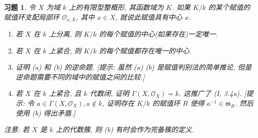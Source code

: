 \documentclass{article}
\theoremstyle{exercise}
\newtheorem{exercise}{习题}[section]
\theoremstyle{plain}
\theoremstyle{remark}
\def\gm{\mathfrak{m}}
\def\cO{\mathscr{O}}
\begin{document}
\begin{exercise}
  令 $X$ 为域 $k$ 上的有限型整概形, 其函数域为 $K$.
  如果 $K / k$ 的某个赋值的赋值环支配局部环 $\cO_{x, X}$, 其中 $x \in X$,
  就说此赋值具有\emph{中心} $x$.
  \begin{enumerate}[label=(\alph*)]
    \item 若 $X$ 在 $k$ 上分离, 则 $K / k$ 的每个赋值的中心(如果存在)一定唯一.
    \item 若 $X$ 在 $k$ 上紧合, 则 $K / k$ 的每个赋值都存在唯一的中心.
    \item 证明 (a) 和 (b) 的逆命题.
          [\emph{提示: 虽然 (a) (b) 是赋值判别法的简单推论,
          但是逆命题需要不同的域中的赋值之间的比较.}]
    \item 若 $X$ 在 $k$ 上紧合, 且 $k$ 代数闭,
          证明 $\Gamma(X, \cO_X) = k$.
          这推广了 (I, 3.4a).
          [\emph{提示: 令 $a \in \Gamma(X, \cO_X), a \notin k$,
          证明存在 $K / k$ 的赋值环 $R$ 使得 $a^{-1} \in \gm_R$.
          然后使用 (b) 得出矛盾.}]
  \end{enumerate}
  \textit{注意:} 若 $X$ 是 $k$ 上的代数簇, 则 (b) 有时会作为完备簇的定义.
\end{exercise}
\end{document}

